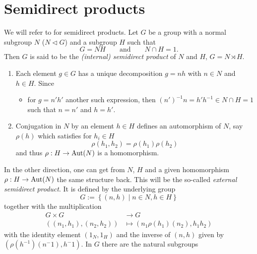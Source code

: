 \section{Semidirect products}
\begin{comment}
  see
  \begin{itemize}
    \item \url{http://nlab.mathforge.org/nlab/show/semidirect+product+group}
    \item \url{http://en.wikipedia.org/wiki/Semidirect_product}
    \item \cite{Robinson2003An}
  \end{itemize}
\end{comment}
We will refer to \cite[75]{Robinson2003An} for semidirect products.
Let $G$ be a group with a normal subgroup $N$ ($N\vartriangleleft G$) and a
subgroup $H$ such that 
\[
  G=NH\qquad\text{and}\qquad N\cap H=1.
\]
Then $G$ is said to be the \emph{(internal) semidirect product} of $N$ and $H$,
$G=N\rtimes H$.
\begin{rem}
  \begin{enumerate}
    \item Each element $g\in G$ has a unique decomposition $g=nh$ with $n\in N$
      and $h\in H$. Since
      \begin{itemize}
        \item[] for $g=n'h'$ another such expression, then
          $(n')^{-1}n=h'h^{-1}\in N\cap H=1$ such that $n=n'$ and $h=h'$.
      \end{itemize}
    \item Conjugation in $N$ by an element $h\in H$ defines an automorphism of
      $N$, say $\rho(h)$ which satisfies for $h_i\in H$
      \[
        \rho(h_1,h_2)=\rho(h_1)\rho(h_2)
      \]
      and thus $\rho:H\to\operatorname{Aut}(N)$ is a homomorphism.
  \end{enumerate}
\end{rem}
In the other direction, one can get from $N$, $H$ and a given homomorphism 
$\rho:H\to\operatorname{Aut}(N)$ the same structure back. This will be the so-called
\emph{external semidirect product}. It is defined by the underlying group
\[
  G:=\left\{(n,h)\mid n\in N,h\in H\right\}
\]
together with the multiplication
\begin{align*}
  G\times G&\to G
\\\left((n_1,h_1),(n_2,h_2)\right)&\mapsto(n_1\rho(h_1)(n_2),h_1h_2)
\end{align*}
with the identity element $(1_N,1_H)$ and the inverse of $(n,h)$ given by
$(\rho(h^{-1})(n^-1),h^-1)$. In $G$ there are the natural subgroups
